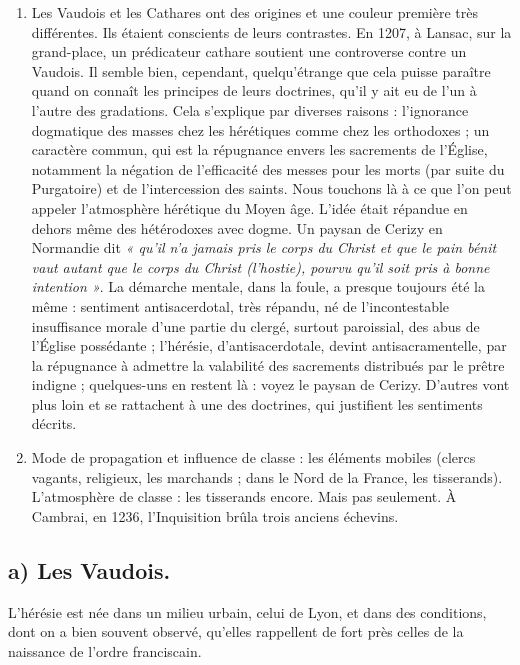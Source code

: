 \documentclass[french,twoside]{book} %
\begin{document}
\begin{enumerate}[itemsep=\baselineskip,]
\item Les Vaudois et les Cathares ont des origines et une couleur première très différentes. Ils étaient conscients de leurs contrastes. En 1207, à Lansac, sur la grand-place, un prédicateur cathare soutient une controverse contre un Vaudois. Il semble bien, cependant, quelqu’étrange que cela puisse paraître quand on connaît les principes de leurs doctrines, qu’il y ait eu de l’un à l’autre des gradations. Cela s’explique par diverses raisons : l’ignorance dogmatique des masses chez les hérétiques comme chez les orthodoxes ; un caractère commun, qui est la répugnance envers les sacrements de l’Église, notamment la négation de l’efficacité des messes pour les morts (par suite du Purgatoire) et de l’intercession des saints. Nous touchons là à ce que l’on peut appeler l’atmosphère hérétique du Moyen âge. L’idée était répandue en dehors même des hétérodoxes avec dogme. Un paysan de Cerizy en Normandie dit \emph{« qu’il n’a jamais pris le corps du Christ et que le pain bénit vaut autant que le corps  
\label{p103} du Christ (l’hostie), pourvu qu’il soit pris à bonne intention »}. La démarche mentale, dans la foule, a presque toujours été la même : sentiment antisacerdotal, très répandu, né de l’incontestable insuffisance morale d’une partie du clergé, surtout paroissial, des abus de l’Église possédante ; l’hérésie, d’antisacerdotale, devint antisacramentelle, par la répugnance à admettre la valabilité des sacrements distribués par le prêtre indigne ; quelques-uns en restent là : voyez le paysan de Cerizy. D’autres vont plus loin et se rattachent à une des doctrines, qui justifient les sentiments décrits.
\item Mode de propagation et influence de classe : les éléments mobiles (clercs vagants, religieux, les marchands ; dans le Nord de la France, les tisserands). L’atmosphère de classe : les tisserands encore. Mais pas seulement. À Cambrai, en 1236, l’Inquisition brûla trois anciens échevins.

\end{enumerate}\subsection[a) Les Vaudois.]{a) Les Vaudois.}
\noindent L’hérésie est née dans un milieu urbain, celui de Lyon, et dans des conditions, dont on a bien souvent observé, qu’elles rappellent de fort près celles de la naissance de l’ordre franciscain.\par
\end{document}
